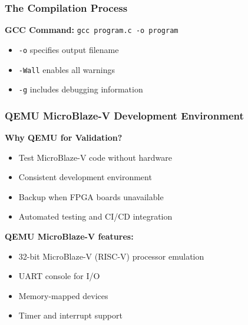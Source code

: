 \documentclass{beamer}
\begin{document}
\begin{frame}
\frametitle{The Compilation Process}
\begin{center}
\end{center}

\textbf{GCC Command:} \texttt{gcc program.c -o program}
\begin{itemize}
    \item \texttt{-o} specifies output filename
    \item \texttt{-Wall} enables all warnings
    \item \texttt{-g} includes debugging information
\end{itemize}
\end{frame}

\begin{frame}
\frametitle{QEMU MicroBlaze-V Development Environment}
\textbf{Why QEMU for Validation?}
\begin{itemize}
    \item Test MicroBlaze-V code without hardware
    \item Consistent development environment
    \item Backup when FPGA boards unavailable
    \item Automated testing and CI/CD integration
\end{itemize}

\vspace{0.5cm}
\textbf{QEMU MicroBlaze-V features:}
\begin{itemize}
    \item 32-bit MicroBlaze-V (RISC-V) processor emulation
    \item UART console for I/O
    \item Memory-mapped devices
    \item Timer and interrupt support
\end{itemize}
\end{frame}
\end{document}
